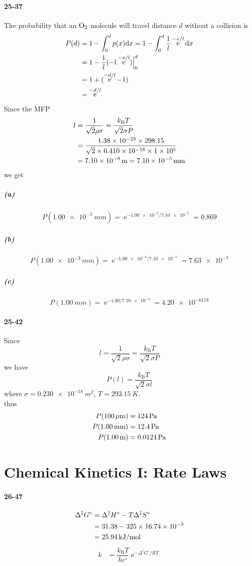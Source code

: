 \documentclass[a4paper]{article}
\DeclareMathOperator{\e}{\mathrm{e}}
\newcommand{\kB}{k_\mathrm{B}}
\newcommand{\ex}[1]{\paragraph{#1}}
\newcommand{\subex}[1]{\subparagraph{#1}}
\numberwithin{equation}{section}
\begin{document}
\ex{25-37}
The probability that an $ \ce{O_2} $ molecule will travel distance $ d $ without a collision is
\begin{align}\label{key}
P(d) &= 1 - \int_0^d p(x)\dd x = 1 - \int_0^d \dfrac{1}{l}\e^{-x/l}\dd x \notag\\
&= 1 - \dfrac{1}{l}(-l\e^{-x/l})\Big|_0^d \notag\\
&= 1 + (\e^{-d/l} - 1) \notag\\
&= \e^{-d/l}
\end{align}
Since the MFP
\begin{align}\label{key}
l &= \dfrac{1}{\sqrt{2}\rho\sigma} = \dfrac{\kB T}{\sqrt{2}\sigma P} \notag\\
&= \dfrac{\num{1.38e-23}\times 298.15}{\sqrt{2}\times\num{0.410e-18}\times\num{1e5}} \notag\\
&= \SI{7.10e-8}{m} = \SI{7.10e-5}{mm}
\end{align}
we get
\subex{(a)}
\begin{equation}\label{key}
P(\SI{1.00e-5}{mm}) = \e^{-\num{1.00e-5}/\num{7.10e-5}} = 0.869
\end{equation}
\subex{(b)}
\begin{equation}\label{key}
P(\SI{1.00e-3}{mm}) = \e^{-\num{1.00e-3}/\num{7.10e-5}} = \num{7.63e-7}
\end{equation}
\subex{(c)}
\begin{equation}\label{key}
P(\SI{1.00}{mm}) = \e^{-\num{1.00}/\num{7.10e-5}} = \num{4.20e-6118}
\end{equation}

\ex{25-42}
Since 
\begin{equation}\label{key}
l = \dfrac{1}{\sqrt{2}\rho\sigma} = \dfrac{\kB T}{\sqrt{2}\sigma P} 
\end{equation}
we have
\begin{equation}\label{key}
P(l) = \dfrac{\kB T}{\sqrt{2}\sigma l}
\end{equation}
where $ \sigma=\SI{0.230e-18}{m^2} $, $ T=\SI{293.15}{K} $.\\
thus
\begin{align}
P(\SI{100}{\mu m}) &= \SI{124}{Pa} \notag\\
P(\SI{1.00}{mm}) &= \SI{12.4}{Pa} \notag\\
P(\SI{1.00}{m}) &= \SI{0.0124}{Pa} 
\end{align}

\section{Chemical Kinetics I: Rate Laws}
\ex{26-47}
\begin{align}
\Delta^\ddagger G^\circ &= \Delta^\ddagger H^\circ - T\Delta^\ddagger S^\circ \notag\\
&= 31.38 - 325\times \num{16.74e-3} \notag\\
&= \SI{25.94}{kJ/mol}
\end{align}
\begin{align}
k &= \dfrac{\kB T}{h c^\circ}\e^{-\Delta^\ddagger G^\circ/RT}
\end{align}
\end{document}
